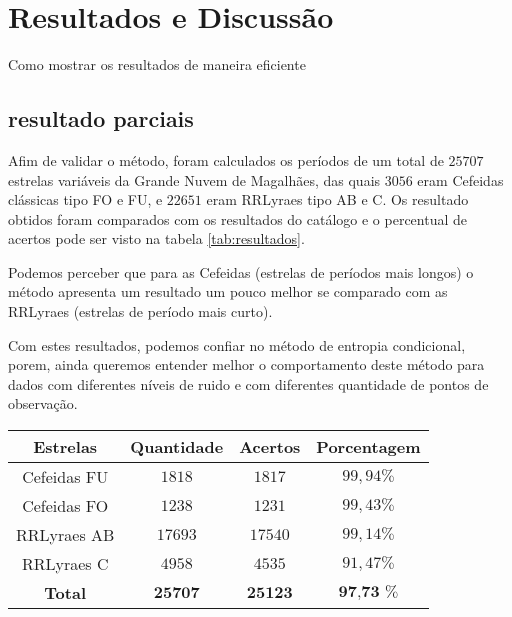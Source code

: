 \chapter{Resultados e Discussão}
\label{cap:resultados}
Como mostrar os resultados de maneira eficiente

\section{resultado parciais}

Afim de validar o método, foram calculados os períodos de um total de $25707$ estrelas variáveis da Grande Nuvem de Magalhães, das quais $3056$ eram Cefeidas clássicas tipo FO e FU, e $22651$ eram RRLyraes tipo AB e C. Os resultado obtidos foram comparados com os resultados do catálogo e o percentual de acertos pode ser visto na tabela \ref{tab:resultados}.

%


Podemos perceber que para as Cefeidas (estrelas de períodos mais longos) o método apresenta um resultado um pouco melhor se comparado com as RRLyraes (estrelas de período mais curto).


Com estes resultados, podemos confiar no método de entropia condicional, porem, ainda queremos entender melhor o comportamento deste método para dados com diferentes níveis de ruido e com diferentes quantidade de pontos de observação.

\begin{center}
\begin{tabular}{c|c|c|c} 
\hline 
Estrelas & Quantidade & Acertos & Porcentagem \\ 
\hline 
Cefeidas FU & $1818$ & $1817$ & $99,94 \%$ \\ 
Cefeidas FO & $1238$ & $1231$ & $99,43 \%$ \\ 
RRLyraes AB& $17693$ & $17540$ & $99,14 \%$ \\ 
RRLyraes C& $4958$ & $4535$ & $91,47 \%$ \\ 
\textbf{Total} & $\textbf{25707}$ & $\textbf{25123}$ & $\textbf{97,73 \%}$ \\ 
\hline 
\end{tabular} 
\label{tab:resultados}
\end{center}



